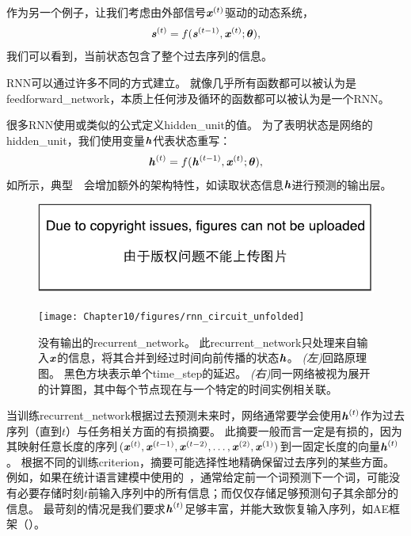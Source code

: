 
作为另一个例子，让我们考虑由外部信号$\boldsymbol{\mathit{x}}^{(t)}$驱动的动态系统，
\begin{align}
 \label{eq:104s}
 \boldsymbol{\mathit{s}}^{(t)} = f(\boldsymbol{\mathit{s}}^{(t-1)}, \boldsymbol{\mathit{x}}^{(t)} ; \boldsymbol{\theta}),
\end{align}
我们可以看到，当前状态包含了整个过去序列的信息。

\gls{RNN}可以通过许多不同的方式建立。
就像几乎所有函数都可以被认为是\gls{feedforward_network}，本质上任何涉及循环的函数都可以被认为是一个\gls{RNN}。

很多\gls{RNN}使用或类似的公式定义\gls{hidden_unit}的值。
为了表明状态是网络的\gls{hidden_unit}，我们使用变量$\boldsymbol{\mathit{h}}$代表状态重写：
\begin{align}
 \label{eq:105h}
 \boldsymbol{\mathit{h}}^{(t)} = f(\boldsymbol{\mathit{h}}^{(t-1)}, \boldsymbol{\mathit{x}}^{(t)} ; \boldsymbol{\theta}),
\end{align}
如所示，典型~~会增加额外的架构特性，如读取状态信息$\boldsymbol{\mathit{h}}$进行预测的输出层。
\begin{figure}[!htb]
\ifOpenSource
\centerline{\includegraphics{figure.pdf}}
\else
\centerline{\texttt{[image: Chapter10/figures/rnn\_circuit\_unfolded]}}
\fi
\caption{没有输出的\gls{recurrent_network}。
此\gls{recurrent_network}只处理来自输入$\boldsymbol{\mathit{x}}$的信息，将其合并到经过时间向前传播的状态$\boldsymbol{\mathit{h}}$。
\emph{(左)}回路原理图。 黑色方块表示单个\gls{time_step}的延迟。
\emph{(右)}同一网络被视为展开的计算图，其中每个节点现在与一个特定的时间实例相关联。
}
\label{fig:chap10_rnn_circuit_unfolded}
\end{figure}

当训练\gls{recurrent_network}根据过去预测未来时，网络通常要学会使用$\boldsymbol{\mathit{h}}^{(t)}$作为过去序列（直到$t$）与任务相关方面的有损摘要。
此摘要一般而言一定是有损的，因为其映射任意长度的序列$(\boldsymbol{\mathit{x}}^{(t)},\boldsymbol{\mathit{x}}^{(t-1)}, \boldsymbol{\mathit{x}}^{(t-2)},\dots,\boldsymbol{\mathit{x}}^{(2)}, \boldsymbol{\mathit{x}}^{(1)})$到一固定长度的向量$\boldsymbol{\mathit{h}}^{(t)}$。
根据不同的训练\gls{criterion}，摘要可能选择性地精确保留过去序列的某些方面。
例如，如果在统计语言建模中使用的~，通常给定前一个词预测下一个词，可能没有必要存储时刻$t$前输入序列中的所有信息；而仅仅存储足够预测句子其余部分的信息。
最苛刻的情况是我们要求$\boldsymbol{\mathit{h}}^{(t)}$足够丰富，并能大致恢复输入序列，如\gls{AE}框架（）。

